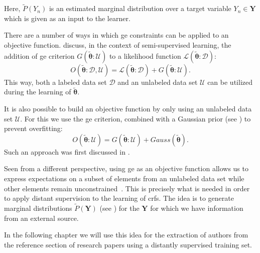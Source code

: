 Here, $\tilde{P}(Y_n)$ is an estimated \gls{marginal distribution} over a \gls{target variable} $Y_n\in\mathbf{Y}$ which is given as an input to the learner.

\bigskip

There are a number of ways in which \gls{ge} constraints can be applied to an \gls{objective function}.
\citet{mann2010generalized} discuss, in the context of semi-supervised learning, the addition of \gls{ge} criterion $G(\bm{\tilde{\theta}}:\mathcal{U})$ to a likelihood function $\mathcal{L}(\bm{\tilde{\theta}}:\mathcal{D})$:
\begin{equation}
  \label{equ:objective-function-l-g}
  O(\bm{\tilde{\theta}}:\mathcal{D},\mathcal{U})=\mathcal{L}(\bm{\tilde{\theta}}:\mathcal{D})+G(\bm{\tilde{\theta}}:\mathcal{U}).
\end{equation}
This way, both a labeled data set $\mathcal{D}$ and an unlabeled data set $\mathcal{U}$ can be utilized during the learning of $\bm{\tilde{\theta}}$.

It is also possible to build an \gls{objective function} by only using an unlabeled data set $\mathcal{U}$.
For this we use the \gls{ge} criterion, combined with a Gaussian prior (see ) to prevent overfitting:
\begin{equation}
  \label{equ:objective-function-g}
  O(\bm{\tilde{\theta}}:\mathcal{U})=G(\bm{\tilde{\theta}}:\mathcal{U})+Gauss(\bm{\tilde{\theta}}).
\end{equation}
Such an approach was first discussed in \citet{mann2008generalized}.

Seen from a different perspective, using \gls{ge} as an objective function allows us to express expectations on a subset of elements from an unlabeled data set while other elements remain unconstrained~\citep{mann2010generalized}.
This is precisely what is needed in order to apply \gls{distant supervision} to the learning of \glspl{crf}.
The idea is to generate \glspl{marginal distribution} $\tilde{P}(\mathbf{Y})$ (see ) for the $\mathbf{Y}$ for which we have information from an external source.

In the following chapter we will use this idea for the extraction of authors from the reference section of research papers using a distantly supervised training set.

